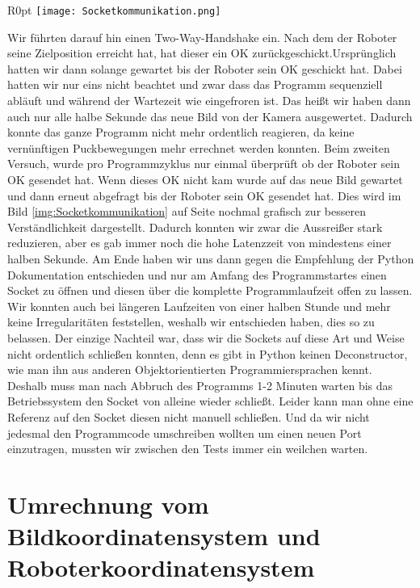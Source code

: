 \begin{wrapfigure}{R}{0pt}
	\vspace{-15pt}
	\texttt{[image: Socketkommunikation.png]}
	\vspace{-15pt}
	\caption{ Veranschaulichung der Socketkommunikation}
	\vspace{-15pt}
	\label{img:Socketkommunikation}
\end{wrapfigure}
Wir führten darauf hin einen Two-Way-Handshake ein. Nach dem der Roboter seine Zielposition erreicht hat, hat dieser ein OK zurückgeschickt.Ursprünglich hatten wir dann solange gewartet bis der Roboter sein OK geschickt hat. Dabei hatten wir nur eins nicht beachtet und zwar dass das Programm sequenziell abläuft und während der Wartezeit wie eingefroren ist. Das heißt wir haben dann auch nur alle halbe Sekunde das neue Bild von der Kamera ausgewertet. Dadurch konnte das ganze Programm nicht mehr ordentlich reagieren, da keine vernünftigen Puckbewegungen mehr errechnet werden konnten. Beim zweiten Versuch, wurde pro Programmzyklus nur einmal überprüft ob der Roboter sein OK gesendet hat. Wenn dieses OK nicht kam wurde auf das neue Bild gewartet und dann erneut abgefragt bis der Roboter sein OK gesendet hat. Dies wird im Bild \ref{img:Socketkommunikation} auf Seite \pageref{img:Socketkommunikation} nochmal grafisch zur besseren Verständlichkeit dargestellt. Dadurch konnten wir zwar die Aussreißer stark reduzieren, aber es gab immer noch die hohe Latenzzeit von mindestens einer halben Sekunde. Am Ende haben wir uns dann gegen die Empfehlung der Python Dokumentation entschieden und nur am Amfang des Programmstartes einen Socket zu öffnen und diesen über die komplette Programmlaufzeit offen zu lassen. Wir konnten auch bei längeren Laufzeiten von einer halben Stunde und mehr keine Irregularitäten feststellen, weshalb wir entschieden haben, dies so zu belassen. Der einzige Nachteil war, dass wir die Sockets auf diese Art und Weise nicht ordentlich schließen konnten, denn es gibt in Python keinen Deconstructor, wie man ihn aus anderen Objektorientierten Programmiersprachen kennt. Deshalb muss man nach Abbruch des Programms 1-2 Minuten warten bis das Betriebssystem den Socket von alleine wieder schließt. Leider kann man ohne eine Referenz auf den Socket diesen nicht manuell schließen. Und da wir nicht jedesmal den Programmcode umschreiben wollten um einen neuen Port einzutragen, mussten wir zwischen den Tests immer ein weilchen warten.


\section{Umrechnung vom Bildkoordinatensystem und Roboterkoordinatensystem}

